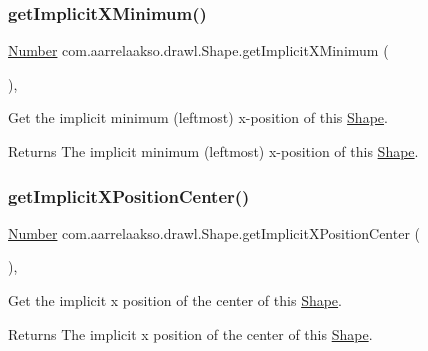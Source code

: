 \subsubsection{\texorpdfstring{get\+Implicit\+X\+Minimum()}{getImplicitXMinimum()}}
{\footnotesize\ttfamily \hyperlink{interfacecom_1_1aarrelaakso_1_1drawl_1_1_number}{Number} com.\+aarrelaakso.\+drawl.\+Shape.\+get\+Implicit\+X\+Minimum (\begin{DoxyParamCaption}{ }\end{DoxyParamCaption})\hspace{0.3cm}{\ttfamily [protected]}, {\ttfamily [inherited]}}



Get the implicit minimum (leftmost) x-\/position of this \hyperlink{classcom_1_1aarrelaakso_1_1drawl_1_1_shape}{Shape}. 

\begin{DoxyReturn}{Returns}
The implicit minimum (leftmost) x-\/position of this \hyperlink{classcom_1_1aarrelaakso_1_1drawl_1_1_shape}{Shape}. 
\end{DoxyReturn}
\mbox{\label{classcom_1_1aarrelaakso_1_1drawl_1_1_shape_a9632097be62eb03e09145763852bda85}} 
\subsubsection{\texorpdfstring{get\+Implicit\+X\+Position\+Center()}{getImplicitXPositionCenter()}}
{\footnotesize\ttfamily \hyperlink{interfacecom_1_1aarrelaakso_1_1drawl_1_1_number}{Number} com.\+aarrelaakso.\+drawl.\+Shape.\+get\+Implicit\+X\+Position\+Center (\begin{DoxyParamCaption}{ }\end{DoxyParamCaption})\hspace{0.3cm}{\ttfamily [protected]}, {\ttfamily [inherited]}}



Get the implicit x position of the center of this \hyperlink{classcom_1_1aarrelaakso_1_1drawl_1_1_shape}{Shape}. 

\begin{DoxyReturn}{Returns}
The implicit x position of the center of this \hyperlink{classcom_1_1aarrelaakso_1_1drawl_1_1_shape}{Shape}. 
\end{DoxyReturn}
\mbox{\label{classcom_1_1aarrelaakso_1_1drawl_1_1_shape_a2f272e8bfa625bb7959d1f722d5ac3df}} 
